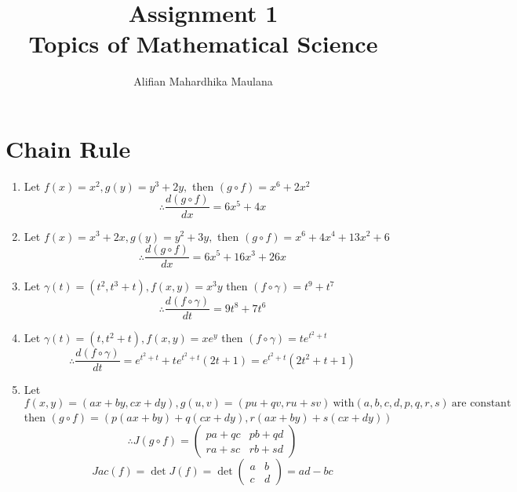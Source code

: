 \documentclass[a4paper,12pt]{article}
\title{Assignment 1\\ Topics of Mathematical Science}
\author{Alifian Mahardhika Maulana}
\begin{document}
\maketitle
\section*{Chain Rule}
\begin{enumerate}
	\item Let $f(x)=x^2,g(y)=y^3+2y,$ then $(g\circ f) = x^6 + 2x^2$
	\begin{equation*}
	\therefore \frac{d(g\circ f)}{dx}=6x^5 + 4x
	\end{equation*}
	
	\item Let $f(x)=x^3+2x,g(y)=y^2+3y,$ then $(g\circ f) = x^6 + 4x^4 + 13x^2 + 6$
	\begin{equation*}
	\therefore \frac{d(g\circ f)}{dx}=6x^5 + 16x^3 + 26x
	\end{equation*}
	
	\item Let $\gamma(t) = (t^2,t^3+t), f(x,y) = x^3y$ then $(f\circ \gamma) = t^9 + t^7$
	\begin{equation*}
	\therefore \frac{d(f\circ \gamma)}{dt}=9t^8 + 7t^6
	\end{equation*}
	
	\item Let $\gamma(t) = (t,t^2+t), f(x,y) = xe^y$ then $(f\circ \gamma) = te^{t^2+t}$
	\begin{equation*}
	\therefore \frac{d(f\circ \gamma)}{dt}=e^{t^2+t} + te^{t^2+t}(2t+1) = e^{t^2+t} (2t^2+t+1)
	\end{equation*}
	
	\item Let $f(x,y)=(ax+by, cx+dy), g(u,v)=(pu+qv, ru+sv)\ \text{with}(a,b,c,d,p,q,r,s)\ \text{are constant}$ then $(g\circ f) = (p(ax+by)+q(cx+dy), r(ax+by)+s(cx+dy))$
	\begin{equation*}
	\therefore J(g\circ f) = \begin{pmatrix}
	pa+qc & pb+qd\\
	ra+sc & rb+sd
	\end{pmatrix}
	\end{equation*}
	\begin{equation*}
	Jac(f) = \det J(f) = \det \begin{pmatrix}
	a & b\\
	c & d
	\end{pmatrix} = ad-bc
	\end{equation*}
	

\end{enumerate}
\end{document}

